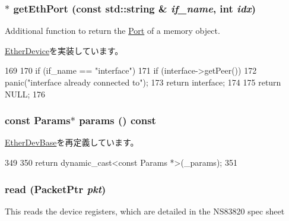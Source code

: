 \hypertarget{classNSGigE_a10260c5a583c0894dcdcd1ced50a53ae}{
\subsubsection[{getEthPort}]{ $\ast$ getEthPort (const std::string \& {\em if\_\-name}, \/  int {\em idx})}}
\label{classNSGigE_a10260c5a583c0894dcdcd1ced50a53ae}
Additional function to return the \hyperlink{classPort}{Port} of a memory object. 

\hyperlink{classEtherDevice_ac1aa24c1f8c0f1ee8bdc3f3d3799f67c}{EtherDevice}を実装しています。


\begin{DoxyCode}
169 {
170     if (if_name == "interface") {
171        if (interface->getPeer())
172            panic("interface already connected to\n");
173        return interface;
174     }
175     return NULL;
176 }
\end{DoxyCode}
\hypertarget{classNSGigE_acd3c3feb78ae7a8f88fe0f110a718dff}{
\subsubsection[{params}]{\setlength{\rightskip}{0pt plus 5cm}const {\bf Params}$\ast$ params () const}}
\label{classNSGigE_acd3c3feb78ae7a8f88fe0f110a718dff}


\hyperlink{classEtherDevBase_a24c177ef5d1124c3ff3e68a7e53532cf}{EtherDevBase}を再定義しています。


\begin{DoxyCode}
349                                  {
350         return dynamic_cast<const Params *>(_params);
351     }
\end{DoxyCode}
\hypertarget{classNSGigE_a613ec7d5e1ec64f8d21fec78ae8e568e}{
\subsubsection[{read}]{ read ({\bf PacketPtr} {\em pkt})}}
\label{classNSGigE_a613ec7d5e1ec64f8d21fec78ae8e568e}
This reads the device registers, which are detailed in the NS83820 spec sheet 

